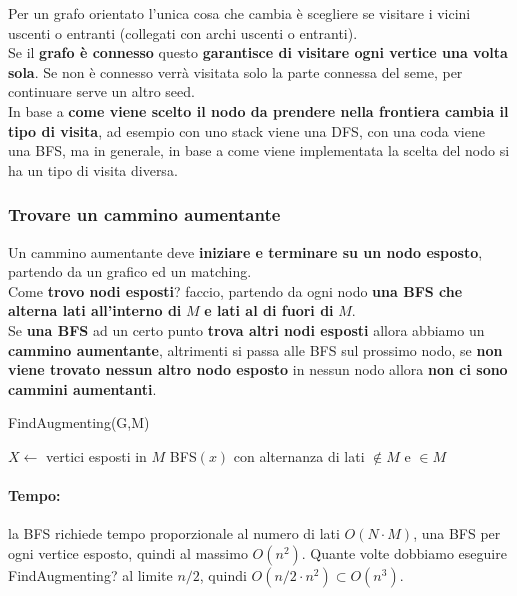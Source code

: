 \documentclass[11pt]{article}
\begin{document}
	Per un grafo orientato l'unica cosa che cambia è scegliere se visitare i vicini uscenti o entranti (collegati con archi uscenti o entranti).\\
	
	Se il \textbf{grafo è connesso} questo \textbf{garantisce di visitare ogni vertice una volta sola}. Se non è connesso verrà visitata solo la parte connessa del seme, per continuare serve un altro seed.\\
	
	In base a \textbf{come viene scelto il nodo da prendere nella frontiera cambia il tipo di visita}, ad esempio con uno stack viene una DFS, con una coda viene una BFS, ma in generale, in base a come viene implementata la scelta del nodo si ha un tipo di visita diversa.\\
	
	\newpage
	
	\subsubsection{Trovare un cammino aumentante}
	Un cammino aumentante deve \textbf{iniziare e terminare su un nodo esposto}, partendo da un grafico ed un matching. \\
	
	Come \textbf{trovo nodi esposti}? faccio, partendo da ogni nodo \textbf{una BFS che alterna lati all'interno di} $M$ \textbf{e lati al di fuori di} $M$.\\
	
	Se \textbf{una BFS} ad un certo punto \textbf{trova altri nodi esposti} allora abbiamo un \textbf{cammino aumentante}, altrimenti si passa alle BFS sul prossimo nodo, se \textbf{non viene trovato nessun altro nodo esposto} in nessun nodo allora \textbf{non ci sono cammini aumentanti}.\\
	
	\begin{algorithm}
		\caption{FindAugmenting(G,M)}
		\begin{algorithmic}
			\STATE $X \leftarrow$ vertici esposti in $M$
				\STATE  BFS$(x)$ con alternanza di lati $\notin M$ e $\in M$
			\ENDFOR
		\end{algorithmic}
	\end{algorithm}
	
	\paragraph{Tempo:} la BFS richiede tempo proporzionale al numero di lati $O(N \cdot M)$, una BFS per ogni vertice esposto, quindi al massimo $O(n^2)$. Quante volte dobbiamo eseguire FindAugmenting? al limite $n/2$, quindi $O(n/2 \cdot n^2) \subset O(n^3)$.\\
	
\end{document}

